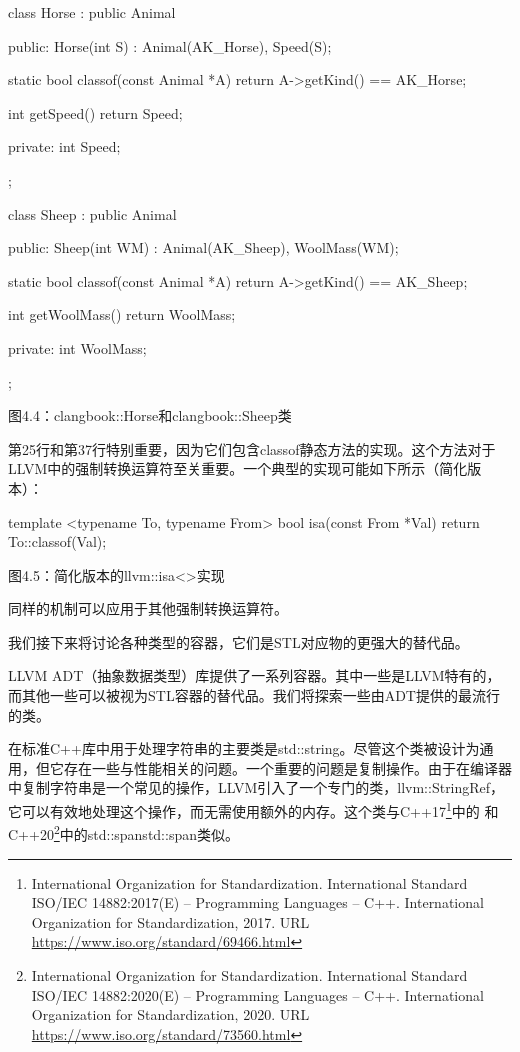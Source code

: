 \begin{cpp}
class Horse : public Animal {
public:
  Horse(int S) : Animal(AK_Horse), Speed(S){};

  static bool classof(const Animal *A) { return A->getKind() == AK_Horse; }

  int getSpeed() { return Speed; }

private:
  int Speed;
};

class Sheep : public Animal {
public:
  Sheep(int WM) : Animal(AK_Sheep), WoolMass(WM){};

  static bool classof(const Animal *A) { return A->getKind() == AK_Sheep; }

  int getWoolMass() { return WoolMass; }

private:
  int WoolMass;
};
\end{cpp}

\begin{center}
图4.4：clangbook::Horse和clangbook::Sheep类
\end{center}

第25行和第37行特别重要，因为它们包含classof静态方法的实现。这个方法对于LLVM中的强制转换运算符至关重要。一个典型的实现可能如下所示（简化版本）：

\begin{cpp}
template <typename To, typename From>
bool isa(const From *Val) {
  return To::classof(Val);
}
\end{cpp}

\begin{center}
图4.5：简化版本的llvm::isa<>实现
\end{center}

同样的机制可以应用于其他强制转换运算符。

我们接下来将讨论各种类型的容器，它们是STL对应物的更强大的替代品。


LLVM ADT（抽象数据类型）库提供了一系列容器。其中一些是LLVM特有的，而其他一些可以被视为STL容器的替代品。我们将探索一些由ADT提供的最流行的类。


在标准C++库中用于处理字符串的主要类是std::string。尽管这个类被设计为通用，但它存在一些与性能相关的问题。一个重要的问题是复制操作。由于在编译器中复制字符串是一个常见的操作，LLVM引入了一个专门的类，llvm::StringRef，它可以有效地处理这个操作，而无需使用额外的内存。这个类与C++17\footnote{International Organization for Standardization. International Standard ISO/IEC 14882:2017(E) – Programming Languages – C++. International Organization for Standardization, 2017. URL \url{https://www.iso.org/standard/69466.html}}中的 和C++20\footnote{International Organization for Standardization. International Standard ISO/IEC 14882:2020(E) – Programming Languages – C++. International Organization for Standardization, 2020. URL \url{https://www.iso.org/standard/73560.html}}中的std::spanstd::span类似。

